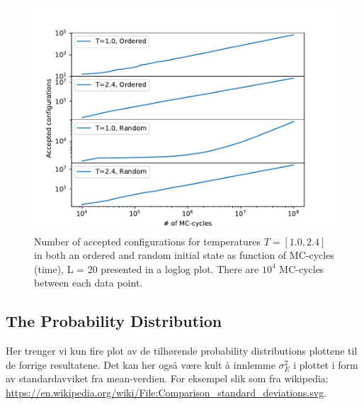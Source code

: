 \documentclass[12pt,english,a4paper]{article}
\begin{document}
\begin{figure}[H]
    \centering
    \includegraphics[scale=0.7]{Code_Files/Figures/Number_of_Accepted_Configs_L_20.pdf}
    \caption{Number of accepted configurations for temperatures $T=[1.0,2.4]$ in both an ordered and random initial state as function of MC-cycles (time), L = 20 presented in a loglog plot. There are $10^4$ MC-cycles between each data point.}
    \label{fig:acc_conf}
\end{figure}

\subsection{The Probability Distribution}

Her trenger vi kun fire plot av de tilhørende probability distributions plottene til de forrige resultatene. Det kan her også være kult å innlemme $\sigma _E^2$ i plottet i form av standardavviket fra mean-verdien. For eksempel slik som fra wikipedia: \url{https://en.wikipedia.org/wiki/File:Comparison_standard_deviations.svg}.
\end{document}
